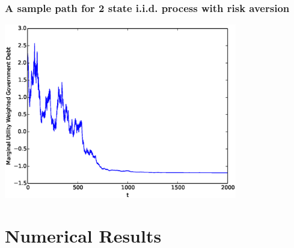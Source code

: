 \documentclass{beamer}
\begin{document}
%
% 
\begin{frame}
	\frametitle{A sample path for 2 state i.i.d. process with risk aversion}
	\begin{center}
	\includegraphics[width=4in]{Images/2stateiid.eps}
	\end{center}
\end{frame}

\section{Numerical Results}
\end{document}
